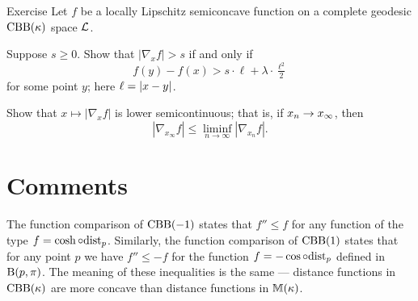 \begin{thm}{Exercise}\label{ex:semicontinuous-grad}
Let $f$ be a locally Lipschitz semiconcave function on a complete geodesic $\mathrm{CBB}(\kappa)$ space $\mathcal{L}$.

\begin{subthm}{}
Suppose $s\ge 0$.
Show that $|\nabla_xf|> s$ if and only if  
\[f(y)-f(x)>s\cdot \ell+\lambda\cdot \tfrac{\ell^2}2\]
for some point $y$; here $\ell=\dist{x}{y}{}$.
\end{subthm}

\begin{subthm}{} Show that $x\mapsto|\nabla_xf|$ is lower semicontinuous;
that is, if $x_n\z\to x_\infty$, then
\[|\nabla_{x_\infty}f|\le \liminf_{n\to\infty} |\nabla_{x_n}f|.\]
\end{subthm}

\end{thm}



\section{Comments}

The function comparison of $\mathrm{CBB}(-1)$ states that 
$f''\le f$ for any function of the type $f=\cosh\circ\mathrm{dist}_p$.
Similarly, the function comparison of $\mathrm{CBB}(1)$ states that for any point $p$ we have
$f''\le -f$ for the function $f=-\cos\circ\mathrm{dist}_p$
defined in $\mathrm{B}{}(p,\pi)$.
The meaning of these inequalities is the same --- distance functions in $\mathrm{CBB}(\kappa)$ are more concave than distance functions in $\mathbb{M}(\kappa)$.
